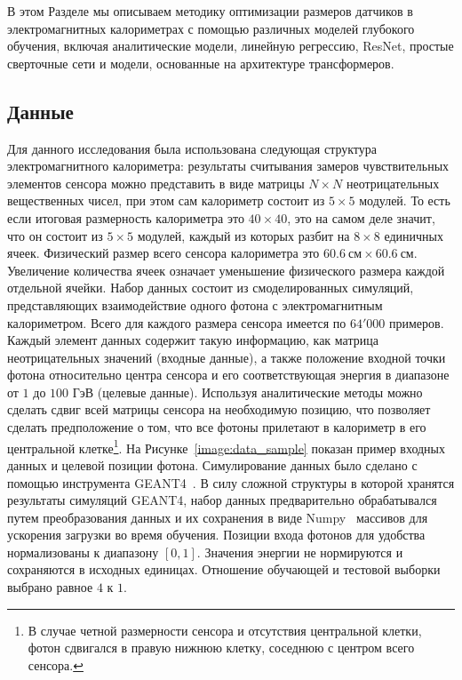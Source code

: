 \documentclass[a4paper,12pt]{extarticle}
\begin{document}
В этом Разделе мы описываем методику оптимизации размеров датчиков в электромагнитных калориметрах с помощью различных моделей глубокого обучения, включая аналитические модели, линейную регрессию, ResNet, простые сверточные сети и модели, основанные на архитектуре трансформеров.

\subsection{Данные}
\label{subsection:data}

Для данного исследования была использована следующая структура электромагнитного калориметра: результаты считывания замеров чувствительных элементов сенсора можно представить в виде матрицы $N \times N$ неотрицательных вещественных чисел, при этом сам калориметр состоит из $5 \times 5$ модулей. То есть если итоговая размерность калориметра это $40 \times 40$, это на самом деле значит, что он состоит из $5 \times 5$ модулей, каждый из которых разбит на $8 \times 8$ единичных ячеек. Физический размер всего сенсора калориметра это $60.6 \: \text{см} \times 60.6 \: \text{см}$. Увеличение количества ячеек означает уменьшение физического размера каждой отдельной ячейки. Набор данных состоит из смоделированных симуляций, представляющих взаимодействие одного фотона с электромагнитным калориметром. Всего для каждого размера сенсора имеется по $64'000$ примеров. Каждый элемент данных содержит такую информацию, как матрица неотрицательных значений (входные данные), а также положение входной точки фотона относительно центра сенсора и его соответствующая энергия в диапазоне от $1$ до $100$ ГэВ (целевые данные). Используя аналитические методы можно сделать сдвиг всей матрицы сенсора на необходимую позицию, что позволяет сделать предположение о том, что все фотоны прилетают в калориметр в его центральной клетке\footnote{В случае четной размерности сенсора и отсутствия центральной клетки, фотон сдвигался в правую нижнюю клетку, соседнюю с центром всего сенсора.}. На Рисунке~\ref{image:data_sample} показан пример входных данных и целевой позиции фотона. Симулирование данных было сделано с помощью инструмента GEANT4~\cite{AGOSTINELLI2003250, ALLISON2016186}. В силу сложной структуры в которой хранятся результаты симуляций GEANT4, набор данных предварительно обрабатывался путем преобразования данных и их сохранения в виде Numpy~\cite{harris2020array} массивов для ускорения загрузки во время обучения. Позиции входа фотонов для удобства нормализованы к диапазону $[0, 1]$. Значения энергии не нормируются и сохраняются в исходных единицах. Отношение обучающей и тестовой выборки выбрано равное $4$ к $1$.
\end{document}
